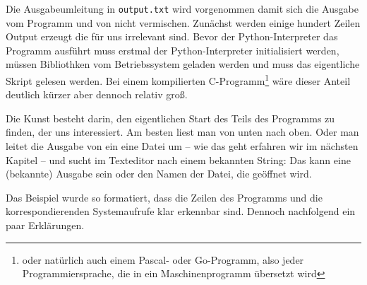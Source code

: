 Die Ausgabeumleitung in \texttt{output.txt} wird vorgenommen damit sich die Ausgabe vom Programm
und von \strace{} nicht vermischen. Zunächst werden einige hundert Zeilen Output erzeugt die für
uns irrelevant sind. Bevor der Python-Interpreter das Programm ausführt muss erstmal der
Python-Interpreter initialisiert werden, müssen Bibliothken vom Betriebssystem geladen werden und
muss das eigentliche Skript gelesen werden. Bei einem kompilierten C-Programm\footnote{oder
natürlich auch einem Pascal- oder Go-Programm, also jeder Programmiersprache, die in ein
Maschinenprogramm übersetzt wird} wäre dieser Anteil deutlich kürzer aber dennoch relativ groß.

Die Kunst besteht darin, den eigentlichen Start des Teils des Programms zu finden, der uns
interessiert. Am besten liest man von unten nach oben. Oder man leitet die Ausgabe von \strace{}
ein eine Datei um -- wie das geht erfahren wir im nächsten Kapitel -- und sucht im Texteditor nach
einem bekannten String: Das kann eine (bekannte) Ausgabe sein oder den Namen der Datei, die
geöffnet wird.

Das Beispiel wurde so formatiert, dass die Zeilen des Programms und die korrespondierenden 
Systemaufrufe klar erkennbar sind. Dennoch nachfolgend ein paar Erklärungen.

